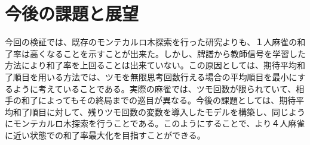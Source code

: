\section{今後の課題と展望}
今回の検証では、既存のモンテカルロ木探索を行った研究よりも、１人麻雀の和了率は高くなることを示すことが出来た。しかし、牌譜から教師信号を学習した方法により和了率を上回ることは出来ていない。この原因としては、期待平均和了順目を用いる方法では、ツモを無限思考回数行える場合の平均順目を最小にするように考えていることである。実際の麻雀では、ツモ回数が限られていて、相手の和了によってもその終局までの巡目が異なる。今後の課題としては、期待平均和了順目に対して、残りツモ回数の変数を導入したモデルを構築し、同じようにモンテカルロ木探索を行うことである。このようにすることで、より４人麻雀に近い状態での和了率最大化を目指すことができる。